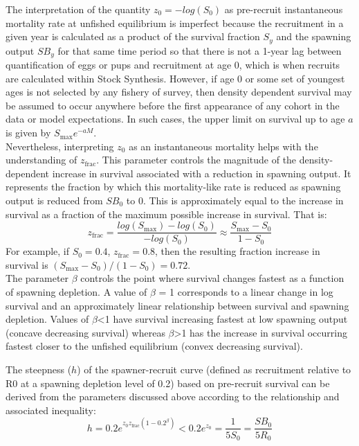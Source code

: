 The interpretation of the quantity $z_0=-log(S_0)$ as pre-recruit instantaneous mortality rate at unfished equilibrium is imperfect because the recruitment in a given year is calculated as a product of the survival fraction $S_y$ and the spawning output $SB_y$ for that same time period so that there is not a 1-year lag between quantification of eggs or pups and recruitment at age 0, which is when recruits are calculated within Stock Synthesis. However, if age 0 or some set of youngest ages is not selected by any fishery of survey, then density dependent survival may be assumed to occur anywhere before the first appearance of any cohort in the data or model expectations. In such cases, the upper limit on survival up to age $a$ is given by $S_{\text{max}}e^{-aM}$. \\
	
Nevertheless, interpreting $z_0$ as an instantaneous mortality helps with the understanding of $z_{\text{frac}}$. This parameter controls the magnitude of the density-dependent increase in survival associated with a reduction in spawning output. It represents the fraction by which this mortality-like rate is reduced as spawning output is reduced from $SB_0$ to 0. This is approximately equal to the increase in survival as a fraction of the maximum possible increase in survival. That is: 
	\begin{equation}
		z_{\text{frac}}=\frac{log(S_{\text{max}})-log(S_0)}{-log(S_0)} \approx \frac{S_{\text{max}}-S_0}{1-S_0}
	\end{equation}
For example, if $S_0 = 0.4$, $z_{\text{frac}}=0.8$, then the resulting fraction increase in survival is $(S_{\text{max}}-S_0)/(1-S_0)=0.72$.\\
	
The parameter $\beta$ controls the point where survival changes fastest as a function of spawning depletion. A value of $\beta$ = 1 corresponds to a linear change in log survival and an approximately linear relationship between survival and spawning depletion. Values of $\beta$<1 have survival increasing fastest at low spawning output (concave decreasing survival) whereas $\beta$>1 has the increase in survival occurring fastest closer to the unfished equilibrium (convex decreasing survival).  
	
The steepness ($h$) of the spawner-recruit curve (defined as recruitment relative to R0 at a spawning depletion level of 0.2) based on pre-recruit survival can be derived from the parameters discussed above according to the relationship and associated inequality:
	\begin{equation}
		h = 0.2e^{z_0z_{\text{frac}}(1-0.2^\beta)}<0.2e^{z_0}=\frac{1}{5S_0}=\frac{SB_0}{5R_0}
	\end{equation}
	
